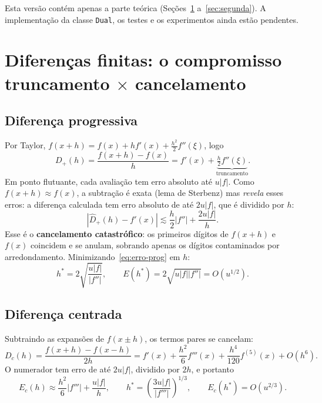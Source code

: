 \documentclass[11pt,a4paper]{article}
\begin{document}
Esta versão contém apenas a parte teórica (Seções~\ref{sec:fd} a~\ref{sec:segunda}). A implementação da classe \texttt{Dual}, os testes e os experimentos ainda estão pendentes.

\section{Diferenças finitas: o compromisso truncamento $\times$ cancelamento}
\label{sec:fd}

\subsection{Diferença progressiva}
Por Taylor, $f(x+h) = f(x) + hf'(x) + \tfrac{h^2}{2}f''(\xi)$, logo
\begin{equation}
D_+(h) = \frac{f(x+h)-f(x)}{h} = f'(x) + \underbrace{\tfrac{h}{2}f''(\xi)}_{\text{truncamento}} .
\end{equation}
Em ponto flutuante, cada avaliação tem erro absoluto até $u|f|$. Como $f(x+h)\approx f(x)$, a subtração é exata (lema de Sterbenz) mas \emph{revela} esses erros: a diferença calculada tem erro absoluto de até $2u|f|$, que é dividido por $h$:
\begin{equation}
|\hat D_+(h) - f'(x)| \lesssim \frac{h}{2}|f''| + \frac{2u|f|}{h} .
\label{eq:erro-prog}
\end{equation}
Esse é o \textbf{cancelamento catastrófico}: os primeiros dígitos de $f(x+h)$ e $f(x)$ coincidem e se anulam, sobrando apenas os dígitos contaminados por arredondamento. Minimizando~\eqref{eq:erro-prog} em $h$:
\begin{equation}
h^\ast = 2\sqrt{\frac{u|f|}{|f''|}}, \qquad E(h^\ast) = 2\sqrt{u|f||f''|} = O(u^{1/2}).
\end{equation}

\subsection{Diferença centrada}
Subtraindo as expansões de $f(x\pm h)$, os termos pares se cancelam:
\begin{equation}
D_c(h) = \frac{f(x+h)-f(x-h)}{2h} = f'(x) + \frac{h^2}{6}f'''(x) + \frac{h^4}{120}f^{(5)}(x) + O(h^6).
\label{eq:centrada}
\end{equation}
O numerador tem erro de até $2u|f|$, dividido por $2h$, e portanto
\begin{equation}
E_c(h) \approx \frac{h^2}{6}|f'''| + \frac{u|f|}{h}, \qquad
h^\ast = \left(\frac{3u|f|}{|f'''|}\right)^{1/3}, \qquad E_c(h^\ast) = O(u^{2/3}).
\end{equation}
\end{document}
